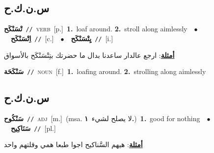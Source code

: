 \documentclass[10pt,a4paper,twoside]{article} %
\begin{document}
\begin{multicols}{2}
\vspace{-3mm}
\subsection*{\color{blue}\foreignlanguage{arabic}{س.ن.ك.ح}\color{blue}{}} 

{\setlength\topsep{0pt}\textbf{\foreignlanguage{arabic}{تْسَنْكَح}}\ {\color{gray}\texttt{//}\color{black}}\ \textsc{verb}\ [p.]\ \textbf{1.}~loaf around.  \textbf{2.}~stroll along aimlessly\ \ $\bullet$\ \ \setlength\topsep{0pt}\textbf{\foreignlanguage{arabic}{اِتْسَنْكَح}}\ {\color{gray}\texttt{//}\color{black}}\ [c.]\ \ $\bullet$\ \ \setlength\topsep{0pt}\textbf{\foreignlanguage{arabic}{يِتْسَنْكَح}}\ {\color{gray}\texttt{//}\color{black}}\ [i.]\  \begin{flushright}\color{gray}\foreignlanguage{arabic}{\textbf{\underline{\foreignlanguage{arabic}{أمثلة}}}: ارجع عالدار ساعدنا بدال ما حضرتك بتِتْسَنْكَح بالأسواق}\end{flushright}\color{black}} \vspace{2mm}

{\setlength\topsep{0pt}\textbf{\foreignlanguage{arabic}{سَنْكَحَة}}\ {\color{gray}\texttt{//}\color{black}}\ \textsc{noun}\ [f.]\ \textbf{1.}~loafing around.  \textbf{2.}~strolling along aimlessly\ } \vspace{2mm}

\vspace{-3mm}
\subsection*{\color{blue}\foreignlanguage{arabic}{س.ن.ك.ح}\color{blue}{ (ntws)}} 

{\setlength\topsep{0pt}\textbf{\foreignlanguage{arabic}{سَنْكُوح}}\ {\color{gray}\texttt{//}\color{black}}\ \textsc{adj}\ [m.]\ \color{gray}(msa. \foreignlanguage{arabic}{لا يصلح لشيء}~\foreignlanguage{arabic}{\textbf{١.}})\color{black}\ \textbf{1.}~good for nothing\ \ $\bullet$\ \ \setlength\topsep{0pt}\textbf{\foreignlanguage{arabic}{سَنَاكِيح}}\ {\color{gray}\texttt{//}\color{black}}\ [pl.]\  \begin{flushright}\color{gray}\foreignlanguage{arabic}{\textbf{\underline{\foreignlanguage{arabic}{أمثلة}}}: هيهم السَّناكيح اجوا طبعا همي وقلتهم واحد}\end{flushright}\color{black}} \vspace{2mm}


\end{multicols}
\end{document}
